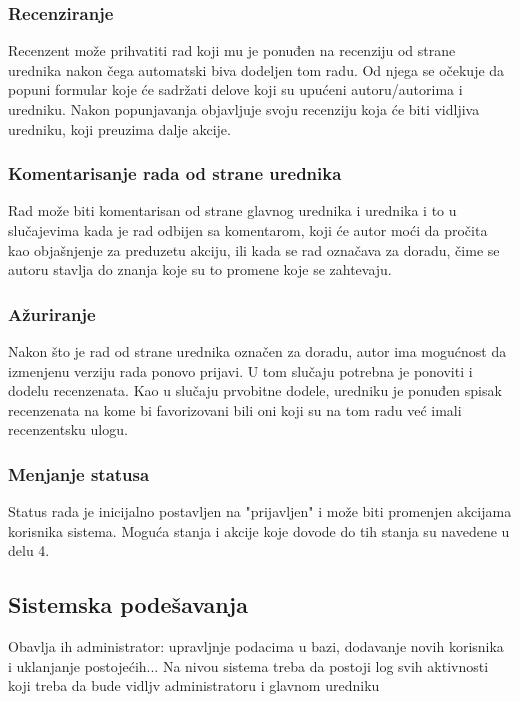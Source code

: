 \documentclass[a4paper]{article}
\begin{document}
\subsubsection{Recenziranje}
Recenzent može prihvatiti rad koji mu je ponuđen na recenziju od strane urednika nakon čega automatski biva dodeljen tom radu. Od njega se očekuje da popuni formular koje će sadržati delove koji su upućeni autoru/autorima i uredniku. Nakon popunjavanja objavljuje svoju recenziju koja će biti vidljiva uredniku, koji preuzima dalje akcije.
\subsubsection{Komentarisanje rada od strane urednika}
Rad može biti komentarisan od strane glavnog urednika i urednika i to u slučajevima kada je rad odbijen sa komentarom, koji će autor moći da pročita kao objašnjenje za preduzetu akciju, ili kada se rad označava za doradu, čime se autoru stavlja do znanja koje su to promene koje se zahtevaju.
\subsubsection{Ažuriranje}
Nakon što je rad od strane urednika označen za doradu, autor ima mogućnost da izmenjenu verziju rada ponovo prijavi. U tom slučaju potrebna je ponoviti i dodelu recenzenata. Kao u slučaju prvobitne dodele, uredniku je ponuđen spisak recenzenata na kome bi favorizovani bili oni koji su na tom radu već imali recenzentsku ulogu.
\subsubsection{Menjanje statusa}
Status rada je inicijalno postavljen na "prijavljen" i može biti promenjen akcijama korisnika sistema. Moguća stanja i akcije koje dovode do tih stanja su navedene u delu 4.


\subsection{Sistemska podešavanja}
Obavlja ih administrator: upravljnje podacima u bazi, dodavanje novih korisnika i uklanjanje postojećih... Na nivou sistema treba da postoji log svih aktivnosti koji treba da bude vidljv administratoru i glavnom uredniku
\end{document}
